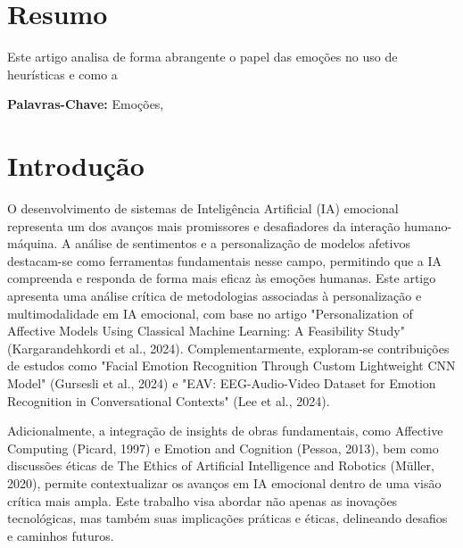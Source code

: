 \documentclass[a4paper,12pt]{report}
\begin{document}
	
	\newpage
	\thispagestyle{empty}
	\mbox{}
	\newpage
	
	
	\section*{Resumo}
	
	Este artigo analisa de forma abrangente o papel das emoções no uso de heurísticas e como a 
	
	\vspace{4em}
	
	\noindent\textbf{Palavras-Chave:} \normalsize{Emoções, }
	
	\newpage
	
	
	\section{Introdução}
	
	O desenvolvimento de sistemas de Inteligência Artificial (IA) emocional representa um dos avanços mais promissores e desafiadores da interação humano-máquina. A análise de sentimentos e a personalização de modelos afetivos destacam-se como ferramentas fundamentais nesse campo, permitindo que a IA compreenda e responda de forma mais eficaz às emoções humanas. Este artigo apresenta uma análise crítica de metodologias associadas à personalização e multimodalidade em IA emocional, com base no artigo "Personalization of Affective Models Using Classical Machine Learning: A Feasibility Study" (Kargarandehkordi et al., 2024). Complementarmente, exploram-se contribuições de estudos como "Facial Emotion Recognition Through Custom Lightweight CNN Model" (Gursesli et al., 2024) e "EAV: EEG-Audio-Video Dataset for Emotion Recognition in Conversational Contexts" (Lee et al., 2024).
	
	Adicionalmente, a integração de insights de obras fundamentais, como Affective Computing (Picard, 1997) e Emotion and Cognition (Pessoa, 2013), bem como discussões éticas de The Ethics of Artificial Intelligence and Robotics (Müller, 2020), permite contextualizar os avanços em IA emocional dentro de uma visão crítica mais ampla. Este trabalho visa abordar não apenas as inovações tecnológicas, mas também suas implicações práticas e éticas, delineando desafios e caminhos futuros.
		
\end{document}
